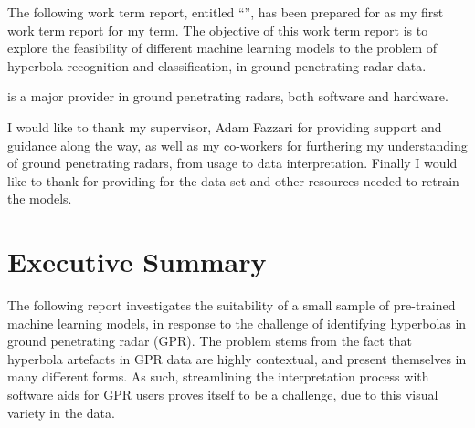 \documentclass[se,blockletter]{uw-wkrpt}
\begin{document}
\newcommand{\thecompany}{Sensors \& Software Inc.}

\frontmatter

\begin{letter}

The following work term report, entitled ``\thetitle'', has been prepared for \theemployer{} as my first work term report for my \theterm{} term. The objective of this work term report is to explore the feasibility of different machine learning models to the problem of hyperbola recognition and classification, in ground penetrating radar data. 

\theemployer{} is a major provider in ground penetrating radars, both software and hardware.

I would like to thank my supervisor, Adam Fazzari for providing support and guidance along the way, as well as my co-workers for furthering my understanding of ground penetrating radars, from usage to data interpretation. Finally I would like to thank \theemployer{} for providing for the data set and other resources needed to retrain the models. 

\end{letter}

\section{Executive Summary}
The following report investigates the suitability of a small sample of pre-trained machine learning models, in response to the challenge of identifying hyperbolas in ground penetrating radar (GPR). The problem stems from the fact that hyperbola artefacts in GPR data are highly contextual, and present themselves in many different forms. As such, streamlining the interpretation process with software aids for GPR users proves itself to be a challenge, due to this visual variety in the data.
\end{document}
